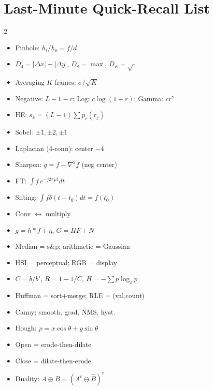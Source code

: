\documentclass[10pt]{article}
\begin{document}
\section{Last-Minute Quick-Recall List}
\begin{multicols}{2}\small
\begin{itemize}
  \item Pinhole: $h_i/h_o = f/d$
  \item $D_4 = |\Delta x|+|\Delta y|$, $D_8 = \max$, $D_E = \sqrt{\cdot}$
  \item Averaging $K$ frames: $\sigma/\sqrt{K}$
  \item Negative: $L-1-r$; Log: $c\log(1+r)$; Gamma: $cr^\gamma$
  \item HE: $s_k = (L-1)\sum p_r(r_j)$
  \item Sobel: $\pm 1, \pm 2, \pm 1$
  \item Laplacian (4-conn): center $-4$
  \item Sharpen: $g = f - \nabla^2 f$ (neg center)
  \item FT: $\int f\,e^{-j2\pi\mu t}dt$
  \item Sifting: $\int f\delta(t-t_0)dt = f(t_0)$
  \item Conv $\leftrightarrow$ multiply
  \item $g = h*f + \eta$, $G = HF + N$
  \item Median = s\&p; arithmetic = Gaussian
  \item HSI = perceptual; RGB = display
  \item $C = b/b'$, $R = 1-1/C$, $H = -\sum p\log_2 p$
  \item Huffman = sort+merge; RLE = (val,count)
  \item Canny: smooth, grad, NMS, hyst.
  \item Hough: $\rho = x\cos\theta + y\sin\theta$
  \item Open = erode-then-dilate
  \item Close = dilate-then-erode
  \item Duality: $A\oplus B = (A^c \ominus \hat{B})^c$
\end{itemize}
\end{multicols}
\end{document}
